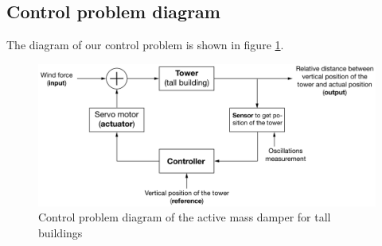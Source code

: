 \subsection{Control problem diagram}
The diagram of our control problem is shown in figure \ref{fig:diagram}.
\begin{figure}[!ht]
    \centering
    \includegraphics[width=1\textwidth]{resources/pdf/diagram.pdf}
    \caption{Control problem diagram of the active mass damper for tall buildings}
    \label{fig:diagram}
\end{figure}
